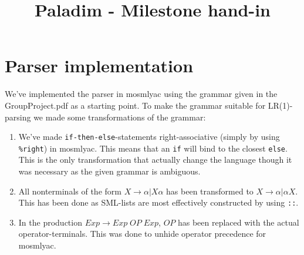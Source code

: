 \documentclass{article}
\title{Paladim - Milestone hand-in}
\author{}
\begin{document}
\maketitle
\newpage
\section{Parser implementation}
We've implemented the parser in mosmlyac using the grammar given in the GroupProject.pdf
as a starting point. To make the grammar suitable for LR(1)-parsing we made some
transformations of the grammar:
\begin{enumerate}
  \item We've made \texttt{if-then-else}-statements right-associative (simply by using
        \texttt{\%right}) in mosmlyac. This means that an \texttt{if} will bind to the
        closest \texttt{else}. This is the only transformation that actually change the
        language though it was necessary as the given grammar is ambiguous.
  \item All nonterminals of the form $X \rightarrow \alpha | X \alpha$ has been transformed
        to $X \rightarrow \alpha | \alpha X$. This has been done as SML-lists are most
        effectively constructed by using \texttt{::}.
  \item In the production $Exp \rightarrow Exp \; OP \; Exp$, $OP$ has been replaced with
        the actual operator-terminals. This was done to unhide operator precedence for
        mosmlyac.
\end{enumerate}
\end{document}

